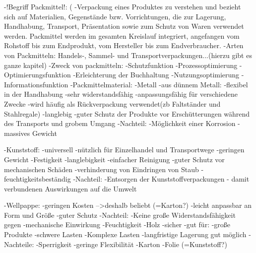 -!Begriff Packmittel!: (%
    -Verpackung eines Produktes zu verstehen und bezieht sich auf Materialien, Gegenstände bzw. Vorrichtungen, die zur Lagerung, Handhabung, Transport, Präsentation sowie zum Schutz von Waren verwendet werden. Packmittel werden im gesamten Kreislauf integriert, angefangen vom Rohstoff bis zum Endprodukt, vom Hersteller bis zum Endverbraucher.
    -Arten von Packmitteln: Handels-, Sammel- und Transportverpackungen...(hierzu gibt es ganze kapitel)
    -Zweck von packmitteln:
        -Schutzfunktion
        -Prozessoptimierung
        -Optimierungsfunktion
        -Erleichterung der Buchhaltung
        -Nutzungsoptimierung
        -Informationsfunktion
    -Packmittelmaterial:
        -Metall
            -aus dünnem Metall:     -flexibel in der Handhabung
                                    -sehr widerstandsfähig
                                    -anpassungsfähig für verschiedene Zwecke
                                    -wird häufig als Rückverpackung verwendet(zb Faltständer und Stahlregale)
                                    -langlebig
                                    -guter Schutz der Produkte vor Erschütterungen während des Transports und grobem Umgang
                                    -Nachteil:  -Möglichkeit einer Korrosion
                                                -massives Gewicht
                                                
        -Kunststoff:    -universell
                        -nützlich für Einzelhandel und Transportwege
                        -geringen Gewicht
                        -Festigkeit
                        -langlebigkeit
                        -einfacher Reinigung
                        -guter Schutz vor mechanischen Schäden
                        -verhinderung von Eindringen von Staub
                        -feuchtigkeitsbeständig
                        -Nachteil:  -Entsorgen der Kunststoffverpackungen
                                    - damit verbundenen Auswirkungen auf die Umwelt
                                    
        -Wellpappe:     -geringen Kosten -->deshalb beliebt
        (=Karton?)      -leicht anpassbar an Form und Größe
                        -guter Schutz
                        -Nachteil:  -Keine große Widerstandsfähigkeit gegen
                                        -mechanische Einwirkung
                                        -Feuchtigkeit
        -Holz       -sicher
                    -gut für:   -große Produkte
                                -schwere Lasten
                                -Komplexe Lasten
                    -langfristige Lagerung gut möglich
                    -Nachteile:     -Sperrigkeit
                                    -geringe Flexibilität
        -Karton
        -Folie
         (=Kunststoff?)             
            
